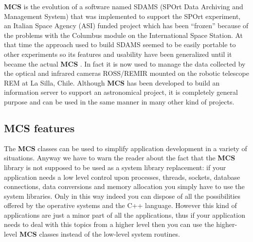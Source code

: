 \documentclass[12pt,titlepage]{article}
\newcommand{\mcs}{\textbf{MCS} }
\begin{document}
\bigskip
\mcs is the evolution of a software named SDAMS (SPOrt Data Archiving
and Management System) %
that was implemented to support the SPOrt experiment, %
an Italian Space Agency (ASI) funded project which has been ``frozen''
because of the problems with the Columbus module on the International
Space Station. At that time the approach used to build SDAMS seemed to
be easily portable to other experiments so its features and usability
have been generalized until it became the actual \mcs. In fact it is
now used to manage the data collected by the optical and infrared
cameras ROSS/REMIR
mounted on the robotic telescope REM %
at La Silla, Chile. %
Although \mcs has been developed to build an information server to
support an astronomical project, it is completely general purpose and
can be used in the same manner in many other kind of projects.
%
%

%
\subsection{\mcs features}
\label{sec-mcs features}
The \mcs classes can be used to simplify application development in
a variety of situations. Anyway we have to warn the reader about the
fact that the \mcs library is not supposed to be used as a system
library replacement: if your application needs a low level control
upon processes, threads, sockets, database connections, data
conversions and memory allocation you simply have to use the system
libraries. Only in this way indeed you can dispose of all the
possibilities offered by the operative systems and the C++ language.
However this kind of applications are just a minor part of all the
applications, thus if your application needs to deal with this topics
from a higher level then you can use the higher-level \mcs classes
instead of the low-level system routines.
\end{document}
